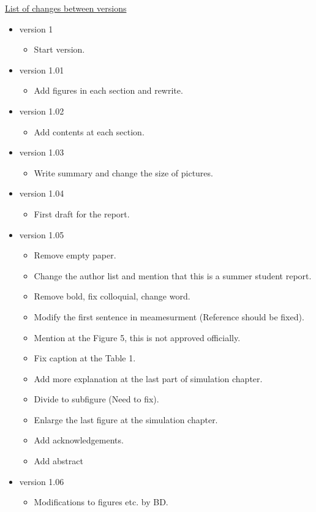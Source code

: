 \underline{List of changes between versions}

\begin{itemize}


\item version 1 
\begin{itemize}
\item Start version.
\end{itemize}

\item version 1.01
\begin{itemize}
\item Add figures in each section and rewrite.
\end{itemize}

\item version 1.02
\begin{itemize}
\item Add contents at each section.
\end{itemize}

\item version 1.03
\begin{itemize}
\item Write summary and change the size of pictures.
\end{itemize}

\item version 1.04
\begin{itemize}
\item First draft for the report.
\end{itemize}

\item version 1.05
\begin{itemize}
\item Remove empty paper.
\item Change the author list and mention that this is a summer student report.
\item Remove bold, fix colloquial, change word.
\item Modify the first sentence in meamesurment (Reference should be fixed).
\item Mention at the Figure 5, this is not approved officially.
\item Fix caption at the Table 1.
\item Add more explanation at the last part of simulation chapter.
\item Divide to subfigure (Need to fix).
\item Enlarge the last figure at the simulation chapter.
\item Add acknowledgements.
\item Add abstract
\end{itemize}

\item version 1.06
\begin{itemize}
\item Modifications to figures etc. by BD. 
\end{itemize}



\end{itemize}

\clearpage

